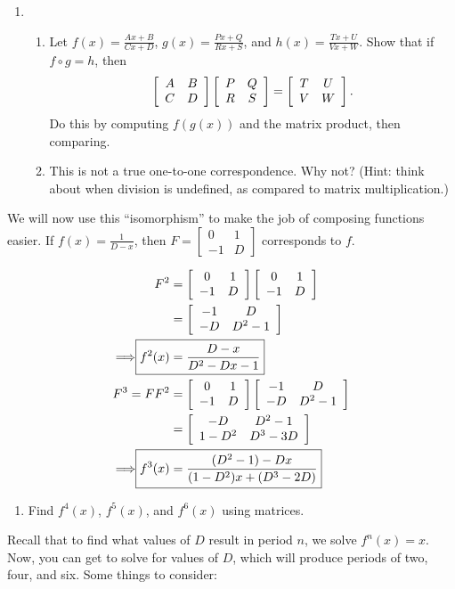 \documentclass[../textbook.tex]{subfiles}
\begin{document}
\begin{enumerate}
\setcounter{enumi}{\value{problem_i}}
\item \begin{enumerate}
\item Let $f(x)=\frac{Ax+B}{Cx+D}$, $g(x)=\frac{Px+Q}{Rx+S}$, and $h(x)=\frac{Tx+U}{Vx+W}$. Show that if $f\circ g = h$, then
$$\left[\begin{array}{cc} A & B \\ C & D \end{array}\right]\left[\begin{array}{cc} P & Q \\ R & S \end{array}\right]=\left[\begin{array}{cc} T & U \\ V & W \end{array}\right].$$
Do this by computing $f(g(x))$ and the matrix product, then comparing.
\item This is not a true one-to-one correspondence. Why not? (Hint: think about when division is undefined, as compared to matrix multiplication.)
\end{enumerate}
\setcounter{problem_i}{\value{enumi}}
\end{enumerate}

\noindent We will now use this ``isomorphism'' to make the job of composing functions easier. If $f(x)=\frac{1}{D-x}$, then $F=\left[\begin{array}{cc} 0 & 1 \\ -1 & D \end{array}\right]$ corresponds to $f$.

\begin{align*}
F^2 &= \twomat{0}{1}{-1}{D}\twomat{0}{1}{-1}{D} \\
&= \twomat{-1}{D}{-D}{D^2-1} \\
\Longrightarrow \Aboxed{f^2(x) &= \frac{D-x}{D^2-Dx-1}} \\
F^3 = FF^2 &= \twomat{0}{1}{-1}{D}\twomat{-1}{D}{-D}{D^2-1} \\
&= \twomat{-D}{D^2-1}{1-D^2}{D^3-3D} \\
\Longrightarrow \Aboxed{f^3(x) &= \frac{(D^2-1)-Dx}{(1-D^2)x+(D^3-2D)}}
\end{align*}

\begin{enumerate}
\setcounter{enumi}{\value{problem_i}}
\item Find $f^4(x)$, $f^5(x)$, and $f^6(x)$ using matrices.
\setcounter{problem_i}{\value{enumi}}
\end{enumerate}

\noindent Recall that to find what values of $D$ result in period $n$, we solve $f^n(x)=x$. Now, you can get to solve for values of $D$, which will produce periods of two, four, and six. Some things to consider:
\end{document}

